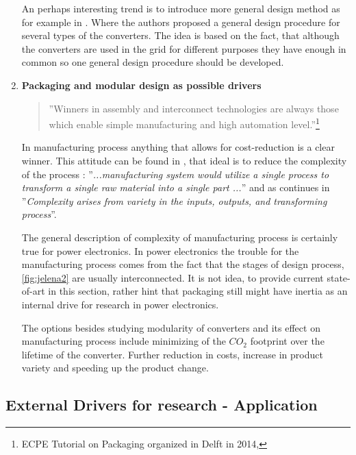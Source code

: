 \documentclass[]{scrartcl}
\begin{document}
\begin{enumerate}
	An perhaps interesting trend is to introduce more general design method as for example in \cite{Ortjohann2009}. Where the authors proposed a general design procedure for several types of the converters. The idea is based on the fact, that although the converters are used in the grid for different purposes they have enough in common so one general design procedure should be developed. 
	
	\item 	\textbf{Packaging and modular design as possible drivers}
	
	 \begin{quote}
		''Winners in assembly and interconnect technologies are always those which enable simple manufacturing and high automation level.''\footnote{ ECPE Tutorial on Packaging organized in Delft in 2014,\cite{Bayerer}}
	\end{quote}
	
In manufacturing process anything that allows for cost-reduction is a clear winner. This attitude can be found in \cite{Ulrich2004}, that ideal is to reduce the complexity of the process  : ''\emph{...manufacturing system would utilize a single process to transform a single raw material into a single part ...}'' and as continues in \cite{Ulrich2004} ''\emph{Complexity arises from variety in the inputs, outputs, and transforming process}''.

The general description of complexity of manufacturing process is certainly true for power electronics. In power electronics the trouble for the manufacturing process comes from the fact that the stages of design process, \ref{fig:jelena2} are usually interconnected. It is not idea, to provide current state-of-art in this section, rather hint that packaging still might have inertia as an internal drive for research in power electronics\cite{VanWyk2013}.

The options besides studying modularity of converters and its effect on manufacturing process include minimizing of the $CO_2$ footprint over the lifetime of the converter. Further reduction in costs, increase in product variety and speeding up the product change.
	\end{enumerate}
	
	

	
	
\subsection{External Drivers for research - Application}
\end{document}
